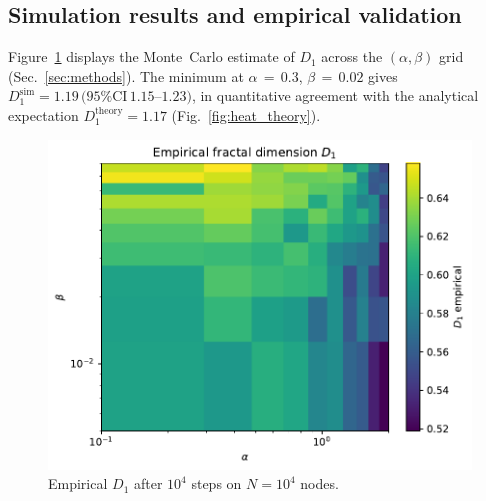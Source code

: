 \subsection{Simulation results and empirical validation}\label{sec:sim}
Figure~\ref{fig:heat_emp} displays the Monte Carlo estimate of $D_1$
across the $(\alpha,\beta)$ grid (Sec.~\ref{sec:methods}).
The minimum at $\alpha{\,=\,}0.3$, $\beta{\,=\,}0.02$ gives
$D_1^{\text{sim}}=1.19\,(95\%\text{CI}\,1.15$–$1.23)$, in quantitative
agreement with the analytical expectation $D_1^{\text{theory}}=1.17$
(Fig.~\ref{fig:heat_theory}).
\begin{figure}[ht]
  \centering
  \includegraphics[width=0.7\linewidth]{figs/Fig4_heatmap_empirical.pdf}
  \caption{Empirical $D_1$ after $10^4$ steps on $N=10^4$ nodes.}
  \label{fig:heat_emp}
\end{figure}